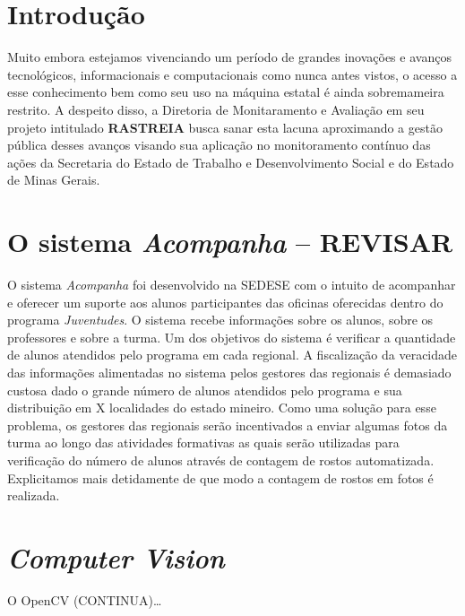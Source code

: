 \documentclass[a4paper, 12pt, openright, oneside, german, french, english, brazil, article]{abntex2}
\begin{document}
	
	\imprimirfolhaderosto
	
	\textual
	
	
	\section*{Introdução}
	
	Muito embora estejamos vivenciando um período de grandes inovações e avanços tecnológicos, informacionais e computacionais como nunca antes vistos, o acesso a esse conhecimento bem como seu uso na máquina estatal é ainda sobremameira restrito. A despeito disso, a Diretoria de Monitaramento e Avaliação em seu projeto intitulado \textbf{RASTREIA} busca sanar esta lacuna aproximando a gestão pública desses avanços visando sua aplicação no monitoramento contínuo das ações da Secretaria do Estado de Trabalho e Desenvolvimento Social e do Estado de Minas Gerais.
	
	\section*{O sistema \textit{Acompanha} -- REVISAR}
	
	O sistema \textit{Acompanha} foi desenvolvido na SEDESE com o intuito de acompanhar e oferecer um suporte aos alunos participantes das oficinas oferecidas dentro do programa \textit{Juventudes}. O sistema recebe informações sobre os alunos, sobre os professores e sobre a turma. Um dos objetivos do sistema é verificar a quantidade de alunos atendidos pelo programa em cada regional. A fiscalização da veracidade das informações alimentadas no sistema pelos gestores das regionais é demasiado custosa dado o grande número de alunos atendidos pelo programa e sua distribuição em X localidades do estado mineiro. Como uma solução para esse problema, os gestores das regionais serão incentivados a enviar algumas fotos da turma ao longo das atividades formativas as quais serão utilizadas para verificação do número de alunos através de contagem de rostos automatizada. Explicitamos mais detidamente de que modo a contagem de rostos em fotos é realizada.
	
	\section{\textit{Computer Vision}}
	
	O OpenCV (CONTINUA)\ldots
	
	
	
\end{document}
